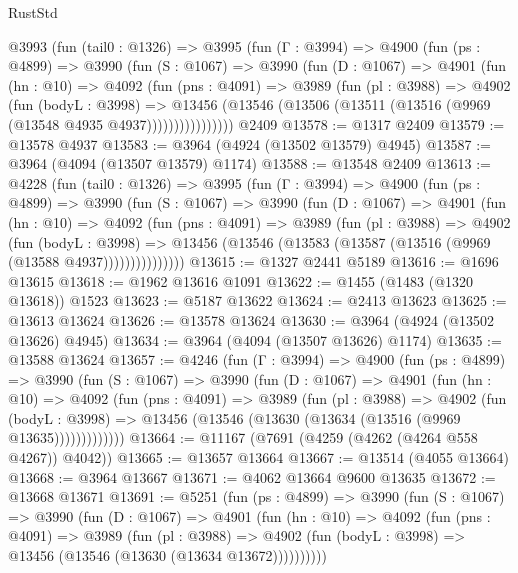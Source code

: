\begin{lexlean}{RustStd}
\begin{coremodule}
    @3993
      (fun (tail0 : @1326) =>
      @3995
        (fun (Γ : @3994) =>
        @4900
          (fun (ps : @4899) =>
          @3990
            (fun (S : @1067) =>
            @3990
              (fun (D : @1067) =>
              @4901
                (fun (hn : @10) =>
                @4092
                  (fun (pns : @4091) =>
                  @3989
                    (fun (pl : @3988) =>
                    @4902
                      (fun (bodyL : @3998) =>
                      @13456
                        (@13546 (@13506 (@13511 (@13516 (@9969 (@13548 @4935 @4937))))))))))))))))
    @2409
@13578 := @1317 @2409
@13579 := @13578 @4937
@13583 := @3964 (@4924 (@13502 @13579) @4945)
@13587 := @3964 (@4094 (@13507 @13579) @1174)
@13588 := @13548 @2409
@13613 := @4228
    (fun (tail0 : @1326) =>
    @3995
      (fun (Γ : @3994) =>
      @4900
        (fun (ps : @4899) =>
        @3990
          (fun (S : @1067) =>
          @3990
            (fun (D : @1067) =>
            @4901
              (fun (hn : @10) =>
              @4092
                (fun (pns : @4091) =>
                @3989
                  (fun (pl : @3988) =>
                  @4902
                    (fun (bodyL : @3998) =>
                    @13456 (@13546 (@13583 (@13587 (@13516 (@9969 (@13588 @4937)))))))))))))))
@13615 := @1327 @2441 @5189
@13616 := @1696 @13615
@13618 := @1962 @13616 @1091
@13622 := @1455 (@1483 (@1320 @13618)) @1523
@13623 := @5187 @13622
@13624 := @2413 @13623
@13625 := @13613 @13624
@13626 := @13578 @13624
@13630 := @3964 (@4924 (@13502 @13626) @4945)
@13634 := @3964 (@4094 (@13507 @13626) @1174)
@13635 := @13588 @13624
@13657 := @4246
    (fun (Γ : @3994) =>
    @4900
      (fun (ps : @4899) =>
      @3990
        (fun (S : @1067) =>
        @3990
          (fun (D : @1067) =>
          @4901
            (fun (hn : @10) =>
            @4092
              (fun (pns : @4091) =>
              @3989
                (fun (pl : @3988) =>
                @4902
                  (fun (bodyL : @3998) =>
                  @13456 (@13546 (@13630 (@13634 (@13516 (@9969 @13635)))))))))))))
@13664 := @11167 (@7691 (@4259 (@4262 (@4264 @558 @4267)) @4042))
@13665 := @13657 @13664
@13667 := @13514 (@4055 @13664)
@13668 := @3964 @13667
@13671 := @4062 @13664 @9600 @13635
@13672 := @13668 @13671
@13691 := @5251
    (fun (ps : @4899) =>
    @3990
      (fun (S : @1067) =>
      @3990
        (fun (D : @1067) =>
        @4901
          (fun (hn : @10) =>
          @4092
            (fun (pns : @4091) =>
            @3989
              (fun (pl : @3988) =>
              @4902 (fun (bodyL : @3998) => @13456 (@13546 (@13630 (@13634 @13672))))))))))

\end{coremodule}
\end{lexlean}
